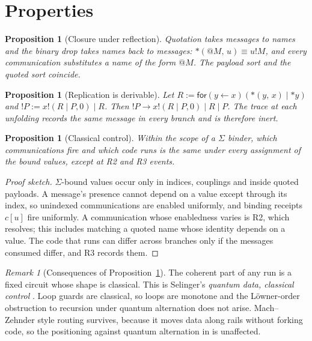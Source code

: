 \documentclass[11pt,a4paper]{article}
\theoremstyle{plain}
\newtheorem{proposition}[theorem]{Proposition}
\theoremstyle{definition}
\theoremstyle{remark}
\newtheorem{remark}[theorem]{Remark}
\newcommand{\rcv}[3]{\mathsf{for}(#1 \leftarrow #2)#3}
\newcommand{\drop}[1]{{*}#1}
\newcommand{\bdrop}[2]{{*}(#1,\,#2)}
\newcommand{\red}{\rightarrow}
\newcommand{\scong}{\equiv}
\begin{document}
\section{Properties}\label{sec:props}

\begin{proposition}[Closure under reflection]
Quotation takes messages to names and the binary drop takes names back to
messages: $\bdrop{@M}{u}\scong u!M$, and every communication substitutes a name
of the form $@M$. The payload sort and the quoted sort coincide.
\end{proposition}

\begin{proposition}[Replication is derivable]
Let $R := \rcv{y}{x}{(\bdrop{y}{x}\mid\drop{y})}$ and
$!P := x!(R\mid P,0)\mid R$. Then $!P\red x!(R\mid P,0)\mid R\mid P$.
The trace at each unfolding records the same message in every branch and is
therefore inert.
\end{proposition}

\begin{proposition}[Classical control]\label{prop:control}
Within the scope of a $\Sigma$ binder, \emph{which communications fire and
which code runs} is the same under every assignment of the bound values,
except at R2 and R3 events.
\end{proposition}

\begin{proof}[Proof sketch]
$\Sigma$-bound values occur only in indices, couplings and inside quoted
payloads. A message's presence cannot depend on a value except through its
index, so unindexed communications are enabled uniformly, and binding receipts
$c[u]$ fire uniformly. A communication whose enabledness varies is R2, which
resolves; this includes matching a quoted name whose identity depends on a
value. The code that runs can differ across branches only if the messages
consumed differ, and R3 records them.
\end{proof}

\begin{remark}[Consequences of Proposition~\ref{prop:control}]
The coherent part of any run is a fixed circuit whose shape is classical. This
is Selinger's \emph{quantum data, classical control} \cite{Selinger}. Loop
guards are classical, so loops are monotone and the Löwner-order obstruction to
recursion under quantum alternation \cite{BP} does not arise. Mach--Zehnder
style routing survives, because it moves data along rails without forking
code, so the positioning against quantum alternation in \cite{GWv6} is
unaffected.
\end{remark}
\end{document}
